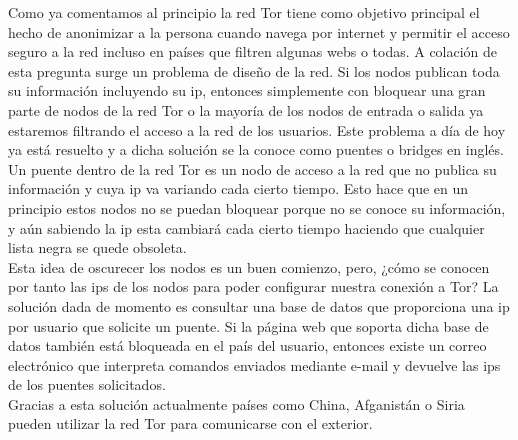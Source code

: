 Como ya comentamos al principio la red Tor tiene como objetivo principal el hecho de anonimizar a  la persona cuando navega por internet y permitir el acceso seguro a la red incluso en países que filtren algunas webs o todas. A colación de esta pregunta surge un problema de diseño de la red. Si los nodos publican toda su información incluyendo su ip, entonces simplemente con bloquear una gran parte de nodos de la red Tor o la mayoría de los nodos de entrada o salida ya estaremos filtrando el acceso a la red de los usuarios. Este problema a día de hoy ya está resuelto y a dicha solución se la conoce como puentes o bridges en inglés.\\
Un puente dentro de la red Tor es un nodo de acceso a la red que no publica su información y cuya ip va variando cada cierto tiempo. Esto hace que en un principio estos nodos no se puedan bloquear porque no se conoce su información, y aún sabiendo la ip esta cambiará cada cierto tiempo haciendo que cualquier lista negra se quede obsoleta.\\
Esta idea de oscurecer los nodos es un buen comienzo, pero, ¿cómo se conocen por tanto las ips de los nodos para poder configurar nuestra conexión a Tor? La solución dada de momento es consultar una base de datos que proporciona una ip por usuario que solicite un puente. Si la página web que soporta dicha base de datos también está bloqueada en el país del usuario, entonces existe un correo electrónico que interpreta comandos enviados mediante e-mail y devuelve las ips de los puentes solicitados.\\
Gracias a esta solución actualmente países como China, Afganistán o Siria pueden utilizar la red Tor para comunicarse con el exterior.